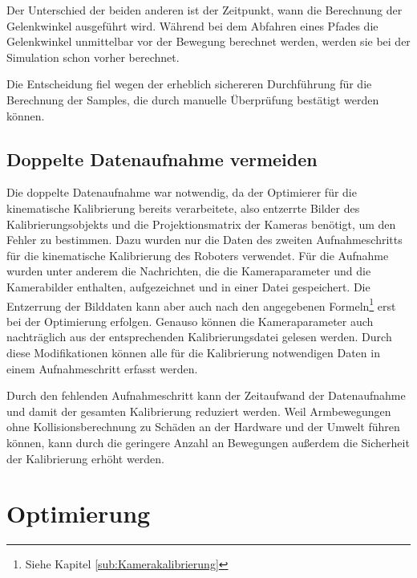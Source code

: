 Der Unterschied der beiden anderen ist der Zeitpunkt, wann die Berechnung 
der Gelenkwinkel ausgeführt wird. Während bei dem Abfahren eines Pfades die Gelenkwinkel unmittelbar vor der 
Bewegung berechnet werden, werden sie bei der Simulation schon vorher berechnet.

Die Entscheidung fiel wegen der erheblich sichereren Durchführung für die Berechnung
der Samples, die durch manuelle Überprüfung bestätigt werden können. 



\subsection{Doppelte Datenaufnahme vermeiden}
\label{sub:Doppelte Datenaufnahme vermeiden}

Die doppelte Datenaufnahme war notwendig, da der Optimierer für die kinematische
Kalibrierung bereits verarbeitete, also entzerrte Bilder des
Kalibrierungsobjekts und die Projektionsmatrix der Kameras benötigt, um den Fehler
zu bestimmen. Dazu wurden nur die Daten des zweiten Aufnahmeschritts für die 
kinematische Kalibrierung des Roboters verwendet. Für die Aufnahme wurden unter
anderem die Nachrichten, die die Kameraparameter und die Kamerabilder enthalten,
aufgezeichnet und in einer Datei gespeichert. Die Entzerrung der Bilddaten kann
aber auch nach den angegebenen Formeln\footnote{Siehe Kapitel \ref{sub:Kamerakalibrierung}} erst bei
der Optimierung erfolgen. Genauso können die Kameraparameter auch nachträglich
aus der entsprechenden Kalibrierungsdatei gelesen werden. Durch diese Modifikationen
können alle für die Kalibrierung notwendigen Daten in einem Aufnahmeschritt 
erfasst werden.

Durch den fehlenden Aufnahmeschritt kann der Zeitaufwand der Datenaufnahme 
und damit der gesamten Kalibrierung reduziert werden.
Weil Armbewegungen ohne Kollisionsberechnung zu Schäden an der Hardware und der
Umwelt führen können, kann durch die geringere Anzahl an Bewegungen außerdem 
die Sicherheit der Kalibrierung erhöht werden.



\section{Optimierung} %

